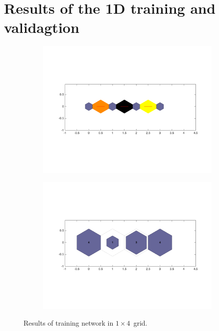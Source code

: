 \newpage
\appendix
\section{Results of the 1D training and validagtion}
\label{app: 1d}
    \begin{figure}
        \begin{subfigure}[b]{0.5\textwidth}
            \centering
            \includegraphics[width=\textwidth]{../images/1d/apps/dist_1_by_4.png}
        \end{subfigure}
        \hfill
        \begin{subfigure}[b]{0.5\textwidth}
             \includegraphics[width=\textwidth]{../images/1d/apps/hit_t_1_by_4.png}
        \end{subfigure}
                \caption{Results of training network in $1\times4$~grid.}
         \label{fig: 1by4T}
    \end{figure}
    
